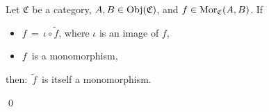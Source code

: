 \begin{definition}
\begin{itemize}
\begin{itemize}
\begin{center}
		\end{center}
	\end{itemize}
\end{itemize}
\end{definition}


\vskip 0.5cm
\begin{lemma}\label{fTildeIsMonomorphismWheneverFIs}
\mbox{}
\vskip 0.1cm
\noindent
Let $\mathfrak{C}$ be a category, $A, B \in \textnormal{Obj}(\mathfrak{C})$, and $f \in \textnormal{Mor}_{\mathfrak{C}}(A,B)$.
\vskip 0.1cm
\noindent
If
\begin{itemize}
\item
	$f \,=\, \iota \circ \widetilde{f}$, where $\iota$ is an image of $f$,
\item
	$f$\, is a monomorphism,
\end{itemize}
then: \,$\widetilde{f}$\, is itself a monomorphism.
\end{lemma}
\proof

\qed


